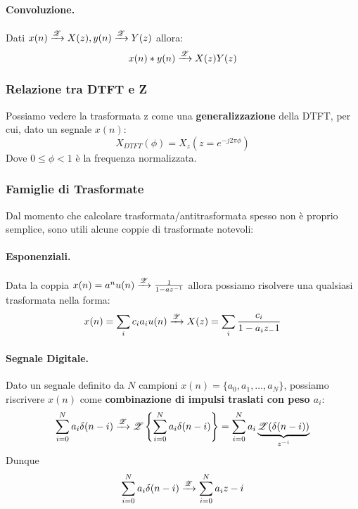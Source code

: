 \paragraph{Convoluzione.}Dati $x(n) \xrightarrow{\mathscr{Z}} X(z), y(n) \xrightarrow{\mathscr{Z}} Y(z)$ allora:
\begin{equation}
    x(n) \ast y(n) \xrightarrow{\mathscr{Z}} X(z)Y(z)
\end{equation}

\subsubsection{Relazione tra DTFT e Z}
Possiamo vedere la trasformata z come una \textbf{generalizzazione} della DTFT, per cui, dato un segnale $x(n)$:
\begin{equation}
    X_{DTFT}(\phi) = X_z(z = e^{-j2\pi \phi})
\end{equation}
Dove $0 \leq \phi < 1$ è la frequenza normalizzata.

\subsubsection{Famiglie di Trasformate}
Dal momento che calcolare trasformata/antitrasformata spesso non è proprio semplice, sono utili alcune coppie di trasformate notevoli:
\paragraph{Esponenziali.} Data la coppia $x(n) = a^nu(n) \xrightarrow{\mathscr{Z}} \frac{1}{1 - az^{-1}}$ allora possiamo risolvere una qualsiasi trasformata nella forma:
\begin{equation}
    x(n) = \sum_{i} c_i a_i u(n) \xrightarrow{\mathscr{Z}} X(z) = \sum_{i} \frac{c_i}{1 - a_iz_-1}
\end{equation}
\paragraph{Segnale Digitale.}Dato un segnale definito da $N$ campioni $x(n) = \{a_0, a_1, \dots, a_N\}$, possiamo riscrivere $x(n)$ come \textbf{combinazione di impulsi traslati con peso $a_i$}:
\begin{equation*}
   \sum_{i = 0}^{N} a_i \delta(n - i) \xrightarrow{\mathscr{Z}} \mathscr{Z}\left\{\sum_{i = 0}^{N} a_i \delta(n - i) \right\} = \sum_{i = 0}^{N} a_i \underbrace{\mathscr{Z}(\delta(n - i))}_{z^{-i}}
\end{equation*}
Dunque
\begin{equation}
    \sum_{i = 0}^{N} a_i \delta(n - i) \xrightarrow{\mathscr{Z}} \sum_{i = 0}^{N} a_i z-i
\end{equation}

